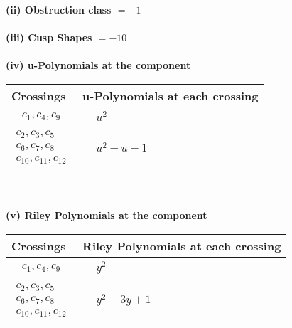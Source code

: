 \documentclass[1p]{elsarticle_modified}
\theoremstyle{definition}
\begin{document}
\flushleft \textbf{(ii) Obstruction class $= -1$}\\~\\
\flushleft \textbf{(iii) Cusp Shapes $= -10$}\\~\\
\newpage\renewcommand{\arraystretch}{1}
\flushleft \textbf{(iv) u-Polynomials at the component}\newline \\
\begin{tabular}{m{50pt}|m{274pt}}
Crossings & \hspace{64pt}u-Polynomials at each crossing \\
\hline $$\begin{aligned}c_{1},c_{4},c_{9}\end{aligned}$$&$\begin{aligned}
&u^2
\end{aligned}$\\
\hline $$\begin{aligned}c_{2},c_{3},c_{5}\\c_{6},c_{7},c_{8}\\c_{10},c_{11},c_{12}\end{aligned}$$&$\begin{aligned}
&u^2- u-1
\end{aligned}$\\
\hline
\end{tabular}\\~\\
\newpage\renewcommand{\arraystretch}{1}
\flushleft \textbf{(v) Riley Polynomials at the component}\newline \\
\begin{tabular}{m{50pt}|m{274pt}}
Crossings & \hspace{64pt}Riley Polynomials at each crossing \\
\hline $$\begin{aligned}c_{1},c_{4},c_{9}\end{aligned}$$&$\begin{aligned}
&y^2
\end{aligned}$\\
\hline $$\begin{aligned}c_{2},c_{3},c_{5}\\c_{6},c_{7},c_{8}\\c_{10},c_{11},c_{12}\end{aligned}$$&$\begin{aligned}
&y^2-3 y+1
\end{aligned}$\\
\hline
\end{tabular}\\~\\
\end{document}
